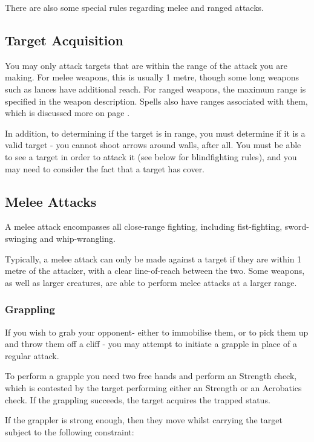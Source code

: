 There are also some special rules regarding melee and ranged attacks.
\subsection{Target Acquisition}

You may only attack targets that are within the range of the attack you are making. For melee weapons, this is usually 1 metre, though some long weapons such as lances have additional reach. For ranged weapons, the maximum range is specified in the weapon description. Spells also have ranges associated with them, which is discussed more on page \pageref{S:Range}. 

In addition, to determining if the target is in range, you must determine if it is a valid target - you cannot shoot arrows around walls, after all. You must be able to see a target in order to attack it (see below for blindfighting rules), and you may need to consider the fact that a target has cover. 


\subsection{Melee Attacks}

A melee attack encompasses all close-range fighting, including fist-fighting, sword-swinging and whip-wrangling.

Typically, a melee attack can only be made against a target if they are within 1 metre of the attacker, with a clear line-of-reach between the two. Some weapons, as well as larger creatures, are able to perform melee attacks at a larger range.  

\subsubsection{Grappling}

If you wish to grab your opponent- either to immobilise them, or to pick them up and throw them off a cliff - you may attempt to initiate a grapple in place of a regular attack. 

To perform a grapple you need two free hands and perform an Strength check, which is contested by the target performing either an Strength or an Acrobatics check. If the grappling succeeds, the target acquires the trapped status. 

If the grappler is strong enough, then they move whilst carrying the target subject to the following constraint:

